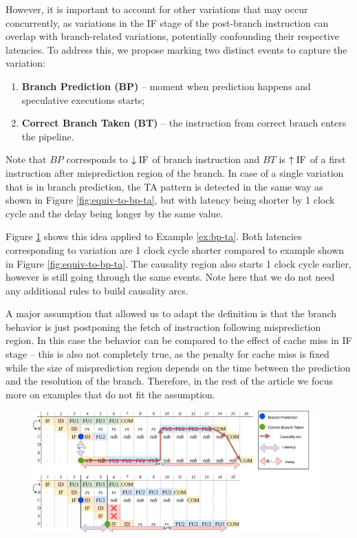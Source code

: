 However, it is important to account for other variations that may occur concurrently, as variations in the IF stage of the post-branch instruction can overlap with branch-related variations, potentially confounding their respective latencies. To address this, we propose marking two distinct events to capture the variation:


\begin{enumerate}
    \item \textbf{Branch Prediction (BP)} -- moment when prediction happens and speculative executions starts;
    \item \textbf{Correct Branch Taken (BT)} -- the instruction from correct branch enters the pipeline.
\end{enumerate}

Note that $BP$ corresponds to $\downarrow\mathrm{IF}$ of branch instruction and $BT$ is $\uparrow\mathrm{IF}$ of a first instruction after misprediction region of the branch. In case of a single variation that is in branch prediction, the TA pattern is detected in the same way as shown in Figure \ref{fig:equiv-to-bp-ta}, but with latency being shorter by 1 clock cycle  and the delay being longer by the same value.

Figure \ref{fig:bp-ta-analyzed} shows this idea applied to Example \ref{ex:bp-ta}. Both latencies corresponding to variation are 1 clock cycle shorter compared to example shown in Figure \ref{fig:equiv-to-bp-ta}. The causality region also starts 1 clock cycle earlier, however is still going through the same events. Note here that we do not need any additional rules to build causality arcs.

A major assumption that allowed us to adapt the definition is that the branch behavior is just postponing the fetch of instruction following misprediction region. In this case the behavior can be compared to the effect of cache miss in IF stage -- this is also not completely true, as the penalty for cache miss is fixed while the size of misprediction region depends on the time between the prediction and the resolution of the branch. Therefore, in the rest of the article we focus more on examples that do not fit the assumption.



\begin{figure}[H]
    \centering
    \includegraphics[width=\textwidth]{figures/simple-branch-ta-analyzed.png}
    \caption{\TODO{}}
    \label{fig:bp-ta-analyzed}
\end{figure}

